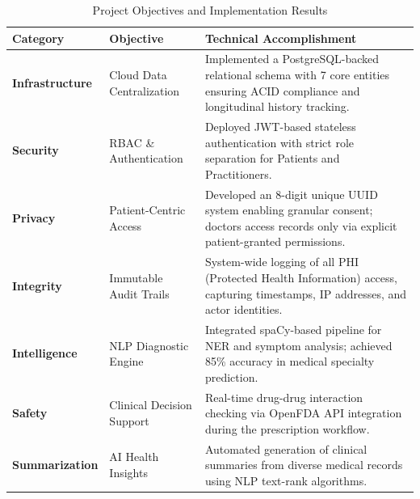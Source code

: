 \documentclass{article}
\begin{document}
\begin{table}[htbp]
    \centering
    \caption{Project Objectives and Implementation Results}
    \label{tab:objectives_refined}
    \small
    \begin{tabularx}{\textwidth}{@{} l p{3.5cm} X @{}}
        \toprule
        \textbf{Category} & \textbf{Objective} & \textbf{Technical Accomplishment} \\
        \midrule
        \textbf{Infrastructure} & Cloud Data Centralization & Implemented a PostgreSQL-backed relational schema with 7 core entities ensuring ACID compliance and longitudinal history tracking. \\
        \addlinespace
        \textbf{Security} & RBAC \& Authentication & Deployed JWT-based stateless authentication with strict role separation for Patients and Practitioners. \\
        \addlinespace
        \textbf{Privacy} & Patient-Centric Access & Developed an 8-digit unique UUID system enabling granular consent; doctors access records only via explicit patient-granted permissions. \\
        \addlinespace
        \textbf{Integrity} & Immutable Audit Trails & System-wide logging of all PHI (Protected Health Information) access, capturing timestamps, IP addresses, and actor identities. \\
        \addlinespace
        \textbf{Intelligence} & NLP Diagnostic Engine & Integrated spaCy-based pipeline for NER and symptom analysis; achieved 85\% accuracy in medical specialty prediction. \\
        \addlinespace
        \textbf{Safety} & Clinical Decision Support & Real-time drug-drug interaction checking via OpenFDA API integration during the prescription workflow. \\
        \addlinespace
        \textbf{Summarization} & AI Health Insights & Automated generation of clinical summaries from diverse medical records using NLP text-rank algorithms. \\
        \bottomrule
    \end{tabularx}
\end{table}
\end{document}
